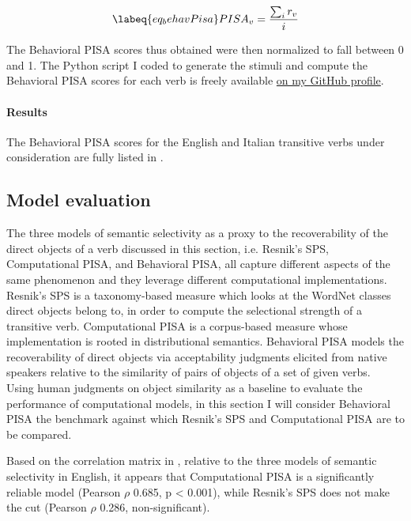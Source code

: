 \begin{equation} \labeq{eq_behavPisa}
PISA_{v} = \frac{\sum_{i} r_{v}}{i}
\end{equation}

The Behavioral PISA scores thus obtained were then normalized to fall between 0 and 1. The Python script I coded to generate the stimuli and compute the Behavioral PISA scores for each verb is freely available \href{https://github.com/giuliacappelli/behavioralPISA}{on my GitHub profile}.

\paragraph{Results} 
The Behavioral PISA scores for the English and Italian transitive verbs under consideration are fully listed in .


\subsection{Model evaluation}

The three models of semantic selectivity as a proxy to the recoverability of the direct objects of a verb discussed in this section, i.e. Resnik's SPS, Computational PISA, and Behavioral PISA, all capture different aspects of the same phenomenon and they leverage different computational implementations. Resnik's SPS is a taxonomy-based measure which looks at the WordNet classes direct objects belong to, in order to compute the selectional strength of a transitive verb. Computational PISA is a corpus-based measure whose implementation is rooted in distributional semantics. Behavioral PISA models the recoverability of direct objects via acceptability judgments elicited from native speakers relative to the similarity of pairs of objects of a set of given verbs.\\
Using human judgments on object similarity as a baseline to evaluate the performance of computational models, in this section I will consider Behavioral PISA the benchmark against which Resnik's SPS and Computational PISA are to be compared.

Based on the correlation matrix in , relative to the three models of semantic selectivity in English, it appears that Computational PISA is a significantly reliable model (Pearson $\rho$ 0.685, p < 0.001), while Resnik's SPS does not make the cut (Pearson $\rho$ 0.286, non-significant).

